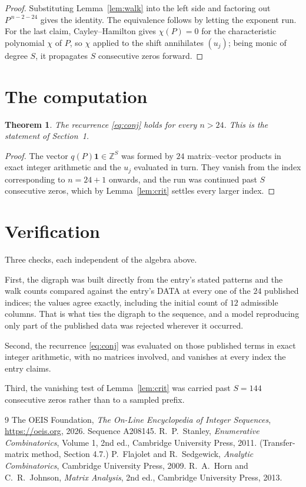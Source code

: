 \documentclass[11pt,a4paper]{article}
\theoremstyle{plain}
\newtheorem{theorem}{Theorem}
\theoremstyle{definition}
\begin{document}
\begin{proof}
Substituting Lemma~\ref{lem:walk} into the left side and factoring out
$P^{\,n-2-24}$ gives the identity. The equivalence follows by letting the exponent
run. For the last claim, Cayley--Hamilton gives $\chi(P)=0$ for the characteristic
polynomial $\chi$ of $P$, so $\chi$ applied to the shift annihilates $(u_j)$; being monic of
degree $S$, it propagates $S$ consecutive zeros forward.
\end{proof}

\section{The computation}

\begin{theorem}
The recurrence \eqref{eq:conj} holds for every $n>24$. This is the statement of
Section~1.
\end{theorem}

\begin{proof}
The vector $q(P)\mathbf{1}\in\mathbb{Z}^{S}$ was formed by $24$ matrix--vector
products in exact integer arithmetic and the $u_j$ evaluated in turn. They vanish from the
index corresponding to $n=24+1$ onwards, and the run was continued past $S$ consecutive
zeros, which by Lemma~\ref{lem:crit} settles every larger index.
\end{proof}

\section{Verification}

Three checks, each independent of the algebra above.

First, the digraph was built directly from the entry's stated patterns and the walk counts
compared against the entry's DATA at every one of the $24$ published indices; the
values agree exactly, including the initial count of $12$ admissible columns. That is
what ties the digraph to the sequence, and a model reproducing only part of the published
data was rejected wherever it occurred.

Second, the recurrence \eqref{eq:conj} was evaluated on those published terms in exact
integer arithmetic, with no matrices involved, and vanishes at every index the entry claims.

Third, the vanishing test of Lemma~\ref{lem:crit} was carried past $S=144$ consecutive
zeros rather than to a sampled prefix.

\begin{thebibliography}{9}
 The OEIS Foundation, \emph{The On-Line Encyclopedia of Integer
Sequences}, \url{https://oeis.org}, 2026. Sequence A208145.
 R.~P.~Stanley, \emph{Enumerative Combinatorics}, Volume 1, 2nd ed.,
Cambridge University Press, 2011. (Transfer-matrix method, Section 4.7.)
 P.~Flajolet and R.~Sedgewick, \emph{Analytic Combinatorics}, Cambridge
University Press, 2009.
 R.~A.~Horn and C.~R.~Johnson, \emph{Matrix Analysis}, 2nd ed., Cambridge
University Press, 2013.
\end{thebibliography}
\end{document}
